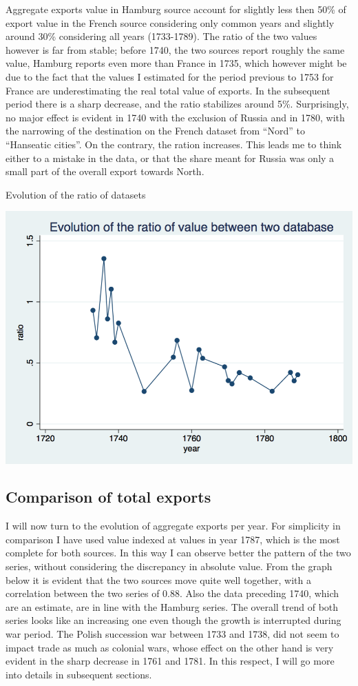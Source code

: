 \documentclass[12pt,a4paper,titlepage]{article}
\begin{document}
Aggregate exports value in Hamburg source account for slightly less then 50\% of export value in the French source considering only common years and slightly around 30\% considering all years (1733-1789). The ratio of the two values however is far from stable; before 1740, the two sources report roughly the same value, Hamburg reports even more than France in 1735, which however might be due to the fact that the values I estimated for the period previous to 1753 for France are underestimating the real total value of exports. In the subsequent period there is a sharp decrease, and the ratio stabilizes around 5\%. Surprisingly, no major effect is evident in 1740 with the exclusion of Russia and in 1780, with the narrowing of the destination on the French dataset from “Nord” to “Hanseatic cities”. On the contrary, the ration increases. This leads me to think either to a mistake in the data, or that the share meant for Russia was only a small part of the overall export towards North.

\begin{center}
\caption{Evolution of the ratio of datasets}
\includegraphics[scale=.3]{long_ratio.png}
\end{center}


\subsection{Comparison of total exports}
I will now turn to the evolution of aggregate exports per year.  For simplicity in comparison I have used value indexed at values in year 1787, which is the most complete for both sources. In this way I can observe better  the pattern of the two series, without considering the discrepancy in absolute value. 
From the graph below it is evident that the two sources move quite well together, with a correlation between the two series of 0.88. Also the data preceding 1740, which are an estimate, are in line with the Hamburg series. 
The overall trend of both series looks like an increasing one even though the growth is interrupted during war period. The Polish succession war between 1733 and 1738, did not seem to impact trade as much as colonial wars, whose effect on the other hand is very evident in the sharp decrease in 1761 and 1781. In this respect, I will go more into details in subsequent sections.
\end{document}
